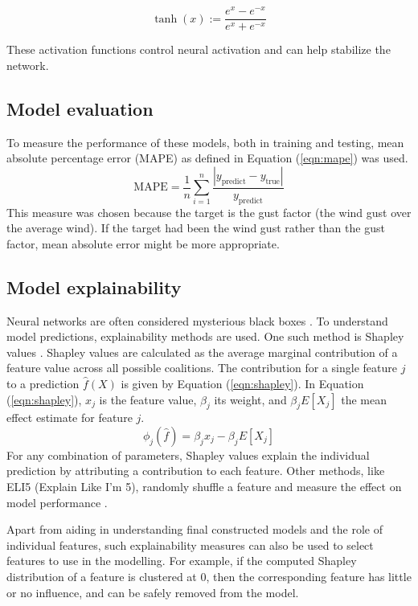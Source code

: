 \begin{equation}
    \label{eqn:tanh}
    \operatorname{tanh}(x):=\frac{e^x-e^{-x}}{e^x+e^{-x}}
\end{equation}

These activation functions control neural activation and can help stabilize the network.
\subsection{Model evaluation}
To measure the performance of these models, both in training and testing, mean absolute percentage error (MAPE) as defined in Equation (\ref{eqn:mape}) was used.
\begin{equation}
    \label{eqn:mape}
    \text{MAPE} = \frac{1}{n}\sum_{i=1}^n\frac{|y_{\mathrm{predict}} - y_{\mathrm{true}}|}{y_{\mathrm{predict}}}
\end{equation}
This measure was chosen because the target is the gust factor (the wind gust over the average wind). If the target had been the wind gust rather than the gust factor, mean absolute error might be more appropriate.

\subsection{Model explainability}
Neural networks are often considered mysterious black boxes \cite{nn_black_box}. To understand model predictions, explainability methods are used. One such method is Shapley values \cite{shapley_information}. Shapley values are calculated as the average marginal contribution of a feature value across all possible coalitions. The contribution for a single feature \(j\) to a prediction \(\hat{f}(X)\) is given by Equation (\ref{eqn:shapley}). In Equation (\ref{eqn:shapley}), \(x_j\) is the feature value, \(\beta_j\) its weight, and \(\beta_j E[X_j]\) the mean effect estimate for feature \(j\).
\begin{equation}
    \label{eqn:shapley}
    \phi_j(\hat{f}) = \beta_j x_j - \beta_j E[X_j]
\end{equation}
For any combination of parameters, Shapley values explain the individual prediction by attributing a contribution to each feature. Other methods, like ELI5 (Explain Like I’m 5), randomly shuffle a feature and measure the effect on model performance \cite{eli5_information}.

Apart from aiding in understanding final constructed models and the role of individual features, such explainability measures can also be used to select features to use in the modelling. For example, if the computed Shapley distribution of a feature is clustered at 0, then the corresponding feature has little or no influence, and can be safely removed from the model.